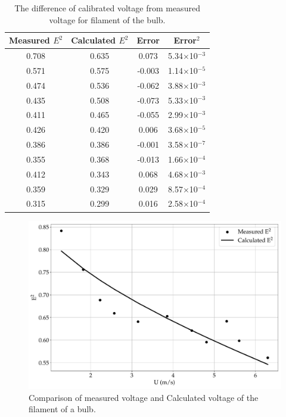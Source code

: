 \begin{table}[H]
    \centering
    \caption{The difference of calibrated voltage from measured voltage for filament of the bulb.}
    \begin{tabular}{|c|c|c|c|}
    \toprule
         Measured $E^2$& Calculated $E^2$ & Error & Error$^2$\\
         \midrule
          0.708 & 0.635 & 0.073 & 5.34$\times$10$^{-3}$ \\ \hline
          0.571 & 0.575 & -0.003 & 1.14$\times$10$^{-5}$ \\ \hline
          0.474 & 0.536 & -0.062 & 3.88$\times$10$^{-3}$ \\ \hline
          0.435 & 0.508 & -0.073 & 5.33$\times$10$^{-3}$ \\ \hline
          0.411 & 0.465 & -0.055 & 2.99$\times$10$^{-3}$ \\ \hline
          0.426 & 0.420 & 0.006 & 3.68$\times$10$^{-5}$ \\ \hline
          0.386 & 0.386 & -0.001 & 3.58$\times$10$^{-7}$ \\ \hline
          0.355 & 0.368 & -0.013 & 1.66$\times$10$^{-4}$ \\ \hline
          0.412 & 0.343 & 0.068 & 4.68$\times$10$^{-3}$ \\ \hline
          0.359 & 0.329 & 0.029 & 8.57$\times$10$^{-4}$ \\ \hline
          0.315 & 0.299 & 0.016 & 2.58$\times$10$^{-4}$ \\
         \bottomrule
         
    \end{tabular}
    \label{tab:error_filament_bulb}
\end{table}
\begin{figure}[H]
    \centering
    \includegraphics[width=\linewidth]{gfx/calibration_of_bulb_filament.pdf}
    \caption{Comparison of measured voltage and Calculated voltage of the filament of a bulb.}
    \label{fig:Calib_curv_filament}
\end{figure}
